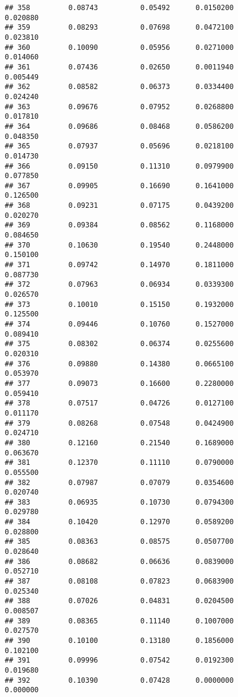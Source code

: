 \documentclass[
]{article}
\begin{document}
\begin{verbatim}
## 358         0.08743          0.05492      0.0150200            0.020880
## 359         0.08293          0.07698      0.0472100            0.023810
## 360         0.10090          0.05956      0.0271000            0.014060
## 361         0.07436          0.02650      0.0011940            0.005449
## 362         0.08582          0.06373      0.0334400            0.024240
## 363         0.09676          0.07952      0.0268800            0.017810
## 364         0.09686          0.08468      0.0586200            0.048350
## 365         0.07937          0.05696      0.0218100            0.014730
## 366         0.09150          0.11310      0.0979900            0.077850
## 367         0.09905          0.16690      0.1641000            0.126500
## 368         0.09231          0.07175      0.0439200            0.020270
## 369         0.09384          0.08562      0.1168000            0.084650
## 370         0.10630          0.19540      0.2448000            0.150100
## 371         0.09742          0.14970      0.1811000            0.087730
## 372         0.07963          0.06934      0.0339300            0.026570
## 373         0.10010          0.15150      0.1932000            0.125500
## 374         0.09446          0.10760      0.1527000            0.089410
## 375         0.08302          0.06374      0.0255600            0.020310
## 376         0.09880          0.14380      0.0665100            0.053970
## 377         0.09073          0.16600      0.2280000            0.059410
## 378         0.07517          0.04726      0.0127100            0.011170
## 379         0.08268          0.07548      0.0424900            0.024710
## 380         0.12160          0.21540      0.1689000            0.063670
## 381         0.12370          0.11110      0.0790000            0.055500
## 382         0.07987          0.07079      0.0354600            0.020740
## 383         0.06935          0.10730      0.0794300            0.029780
## 384         0.10420          0.12970      0.0589200            0.028800
## 385         0.08363          0.08575      0.0507700            0.028640
## 386         0.08682          0.06636      0.0839000            0.052710
## 387         0.08108          0.07823      0.0683900            0.025340
## 388         0.07026          0.04831      0.0204500            0.008507
## 389         0.08365          0.11140      0.1007000            0.027570
## 390         0.10100          0.13180      0.1856000            0.102100
## 391         0.09996          0.07542      0.0192300            0.019680
## 392         0.10390          0.07428      0.0000000            0.000000

\end{verbatim}
\end{document}
